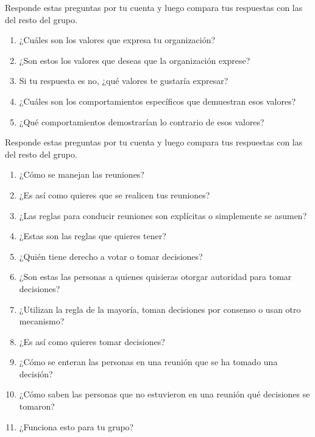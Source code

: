 
Responde estas preguntas por tu cuenta y
luego compara tus respuestas con las del resto del grupo.

\begin{enumerate}

\item
  ¿Cuáles son los valores que expresa tu organización?

\item
  ¿Son estos los valores que deseas que la organización exprese?

\item
  Si tu respuesta es no, ¿qué valores te gustaría expresar?

\item
  ¿Cuáles son los comportamientos específicos que demuestran esos valores?

\item
  ¿Qué comportamientos demostrarían lo contrario de esos valores?
\end{enumerate}


Responde estas preguntas por tu cuenta y
luego compara tus respuestas con las del resto del grupo.

\begin{enumerate}

\item
  ¿Cómo se manejan las reuniones?

\item
  ¿Es así como quieres que se realicen tus reuniones?

\item
  ¿Las reglas para conducir reuniones son explícitas o simplemente se asumen?

\item
  ¿Estas son las reglas que quieres tener?

\item
  ¿Quién tiene derecho a votar o tomar decisiones?

\item
  ¿Son estas las personas a quienes quisieras otorgar autoridad para tomar decisiones?

\item
  ¿Utilizan la regla de la mayoría, toman decisiones por consenso o usan otro mecanismo?

\item
  ¿Es así como quieres tomar decisiones?

\item
  ¿Cómo se enteran las personas en una reunión que se ha tomado una decisión?

\item
  ¿Cómo saben las personas que no estuvieron en una reunión qué decisiones se tomaron?

\item
  ¿Funciona esto para tu grupo?

\end{enumerate}

